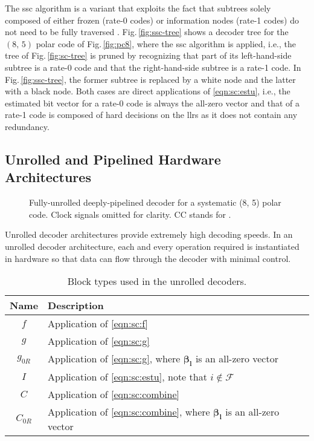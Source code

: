 \documentclass[conference,letterpaper]{IEEEtran}
\newcommand{\mvec}[1]{\bm{#1}}
\begin{document}
The \gls{ssc} algorithm is a variant that exploits the fact that subtrees solely composed of either frozen (rate-0 codes) or information nodes (rate-1 codes) do not need to be fully traversed \cite{Alamdar-Yazdi2011}. 
Fig.\,\ref{fig:ssc-tree} shows a decoder tree for the $(8,\,5)$ polar code of Fig.\,\ref{fig:pc8}, where the \gls{ssc} algorithm is applied, i.e., the tree of Fig.\,\ref{fig:sc-tree} is pruned by recognizing that part of its left-hand-side subtree is a rate-0 code and that the right-hand-side subtree is a rate-1 code.
In Fig.\,\ref{fig:ssc-tree}, the former subtree is replaced by a white node and the latter with a black node. Both cases are direct applications of \eqref{eqn:sc:estu}, i.e., the estimated bit vector for a rate-0 code is always the all-zero vector and that of a rate-1 code is composed of hard decisions on the \glspl{llr} as it does not contain any redundancy.

\subsection{Unrolled and Pipelined Hardware Architectures}\label{sec:bg:unrolled}
\begin{figure}[t]
  \centering
  \resizebox{\columnwidth}{!}{}
  \caption{Fully-unrolled deeply-pipelined decoder for a systematic (8, 5) polar code. Clock signals omitted for clarity. CC stands for .}
  \label{fig:unrolled_deeply_arch_8_5}
\end{figure}

Unrolled decoder architectures provide extremely high decoding speeds. In an unrolled decoder architecture, each and every operation required is instantiated in hardware so that data can flow through the decoder with minimal control. 

\begin{table}[t]
\centering
\caption{Block types used in the unrolled decoders.}
\begin{tabular}{cl}
  \toprule
  \textbf{Name} & \textbf{Description}\\
  \midrule
  $f$ & Application of \eqref{eqn:sc:f}\vspace{2pt}\\
  $g$ & Application of \eqref{eqn:sc:g}\vspace{2pt}\\
  $g_{0R}$ & Application of \eqref{eqn:sc:g}, where $\mvec{\beta_l}$ is an all-zero vector\vspace{2pt}\\
  $I$ & Application of \eqref{eqn:sc:estu}, note that $i \notin \mathcal{F}$\vspace{2pt}\\
  $C$ & Application of \eqref{eqn:sc:combine}\vspace{2pt}\\
  $C_{0R}$ & Application of \eqref{eqn:sc:combine}, where $\mvec{\beta_l}$ is an all-zero vector\vspace{2pt}\\
  \bottomrule
\end{tabular}
\label{tab:block-types}
\end{table}
\end{document}
